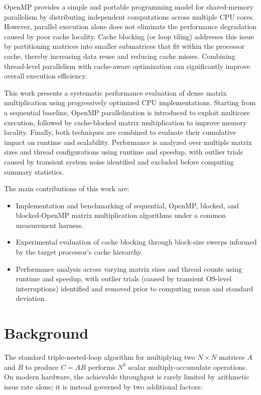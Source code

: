 \documentclass[11pt]{article}
\begin{document}
OpenMP provides a simple and portable programming model for shared-memory parallelism by distributing independent computations across multiple CPU cores. However, parallel execution alone does not eliminate the performance degradation caused by poor cache locality. Cache blocking (or loop tiling) addresses this issue by partitioning matrices into smaller submatrices that fit within the processor cache, thereby increasing data reuse and reducing cache misses. Combining thread-level parallelism with cache-aware optimization can significantly improve overall execution efficiency.

This work presents a systematic performance evaluation of dense matrix multiplication using progressively optimized CPU implementations. Starting from a sequential baseline, OpenMP parallelization is introduced to exploit multicore execution, followed by cache-blocked matrix multiplication to improve memory locality. Finally, both techniques are combined to evaluate their cumulative impact on runtime and scalability. Performance is analyzed over multiple matrix sizes and thread configurations using runtime and speedup, with outlier trials caused by transient system noise identified and excluded before computing summary statistics.

The main contributions of this work are:
\begin{itemize}[noitemsep]
    \item Implementation and benchmarking of sequential, OpenMP, blocked, and blocked-OpenMP matrix multiplication algorithms under a common measurement harness.
    \item Experimental evaluation of cache blocking through block-size sweeps informed by the target processor's cache hierarchy.
    \item Performance analysis across varying matrix sizes and thread counts using runtime and speedup, with outlier trials (caused by transient OS-level interruptions) identified and removed prior to computing mean and standard deviation.
\end{itemize}

\section{Background}
\label{sec:background}

The standard triple-nested-loop algorithm for multiplying two $N \times N$ matrices $A$ and $B$ to produce $C = AB$ performs $N^3$ scalar multiply-accumulate operations. On modern hardware, the achievable throughput is rarely limited by arithmetic issue rate alone; it is instead governed by two additional factors:
\end{document}
